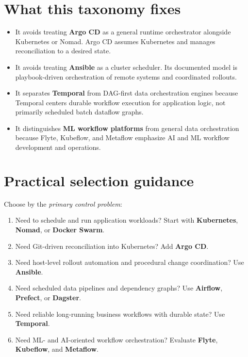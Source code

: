 \documentclass[11pt]{article}
\begin{document}
\section{What this taxonomy fixes}
\begin{itemize}
    \item It avoids treating \textbf{Argo CD} as a general runtime orchestrator alongside Kubernetes or Nomad. Argo CD assumes Kubernetes and manages reconciliation to a desired state.\cite{ArgoCDHome}
    \item It avoids treating \textbf{Ansible} as a cluster scheduler. Its documented model is playbook-driven orchestration of remote systems and coordinated rollouts.\cite{AnsiblePlaybooks,AnsibleRolling}
    \item It separates \textbf{Temporal} from DAG-first data orchestration engines because Temporal centers durable workflow execution for application logic, not primarily scheduled batch dataflow graphs.\cite{TemporalWhatIs,TemporalUnderstanding}
    \item It distinguishes \textbf{ML workflow platforms} from general data orchestration because Flyte, Kubeflow, and Metaflow emphasize AI and ML workflow development and operations.\cite{FlyteOSS,KubeflowIntro,MetaflowWhatIs}
\end{itemize}

\section{Practical selection guidance}
Choose by the \emph{primary control problem}:
\begin{enumerate}
    \item Need to schedule and run application workloads? Start with \textbf{Kubernetes}, \textbf{Nomad}, or \textbf{Docker Swarm}.\cite{KubernetesOverview,NomadWhatIs,DockerSwarm}
    \item Need Git-driven reconciliation into Kubernetes? Add \textbf{Argo CD}.\cite{ArgoCDHome}
    \item Need host-level rollout automation and procedural change coordination? Use \textbf{Ansible}.\cite{AnsiblePlaybooks}
    \item Need scheduled data pipelines and dependency graphs? Use \textbf{Airflow}, \textbf{Prefect}, or \textbf{Dagster}.\cite{AirflowHome,PrefectQuickstart,DagsterOverview}
    \item Need reliable long-running business workflows with durable state? Use \textbf{Temporal}.\cite{TemporalWhatIs}
    \item Need ML- and AI-oriented workflow orchestration? Evaluate \textbf{Flyte}, \textbf{Kubeflow}, and \textbf{Metaflow}.\cite{FlyteOSS,KubeflowIntro,MetaflowWhatIs}
\end{enumerate}
\end{document}

